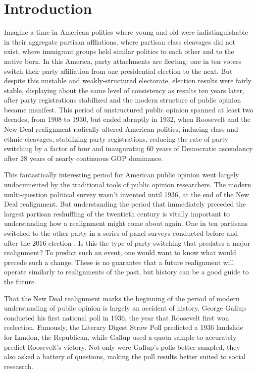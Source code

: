 \documentclass[11pt]{scrartcl}\usepackage[]{graphicx}\usepackage[]{color}
\begin{document}
\section*{Introduction}
Imagine a time in American politics where  young and old were indistinguishable in their aggregate partisan affliations, where partisan class cleavages did not exist, where immigrant groups held similar politics to each other and to the native born. In this America, party attachments are fleeting: one in ten voters switch their party affiliation from one presidential election to the next. But despite this unstable and weakly-structured electorate, election results were fairly stable, displaying about the same level of consistency as results ten years later, after party registrations stabilized and the modern structure of public opinion became manifest.  This period of unstructured public opinion spanned at least two decades, from 1908 to 1930, but ended abruptly in 1932, when Roosevelt and the New Deal realignment radically altered American politics, inducing class and ethnic cleavages, stabilizing party registrations, reducing the rate of party switching by a factor of four and inaugurating 60 years of Democratic ascendancy after 28 years of nearly continuous GOP dominance.  

This fantastically interesting period for American public opinion went largely undocumented by the traditional tools of public opinion researchers. The modern multi-question political survey wasn't invented until 1936, at the end of the New Deal realignment. But understanding the period that immediately preceded the largest partisan reshuffling of the twentieth century is vitally important to understanding how a realignment might come about again. One in ten partisans switched to the other party in a series of panel surveys conducted before and after the 2016 election \citep{doherty2017partisan}. Is this the type of party-switching that predates a major realignment? To predict such an event, one would want to know what would precede such a change. These is no guarantee that a future realignment will operate similarly to realignments of the past, but history can be a good guide to the future. 

That the New Deal realignment marks the beginning of the period of modern understanding of public opinion is largely an accident of history.  George Gallup conducted his first national poll in 1936, the year that Roosevelt first won reelection. Famously, the Literary Digest Straw Poll predicted a 1936 landslide for Landon, the Republican, while Gallup used a quota sample to accurately predict Roosevelt's victory. Not only were Gallup's polls better-sampled, they also asked a battery of questions, making the poll results better suited to social  reseasrch.
\end{document}
